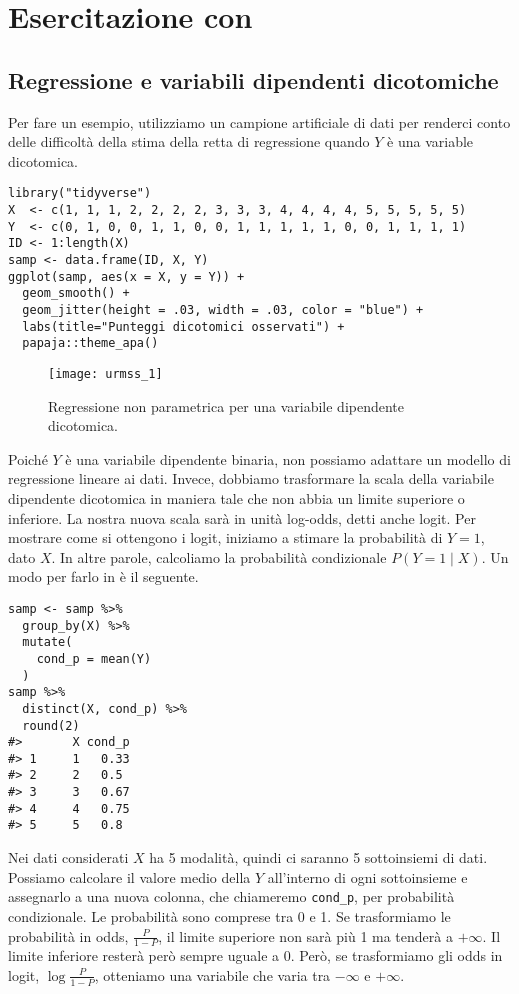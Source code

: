 \chapter{Esercitazione con \R}
\label{chapter:esercitazione_irt} 

\section{Regressione e variabili dipendenti dicotomiche}

Per fare un esempio, utilizziamo un campione artificiale di dati per renderci conto delle difficoltà della stima della retta di regressione quando $Y$ è una variable dicotomica.

\begin{lstlisting}
library("tidyverse")
X  <- c(1, 1, 1, 2, 2, 2, 2, 3, 3, 3, 4, 4, 4, 4, 5, 5, 5, 5, 5)
Y  <- c(0, 1, 0, 0, 1, 1, 0, 0, 1, 1, 1, 1, 1, 0, 0, 1, 1, 1, 1)
ID <- 1:length(X)
samp <- data.frame(ID, X, Y)
ggplot(samp, aes(x = X, y = Y)) + 
  geom_smooth() +
  geom_jitter(height = .03, width = .03, color = "blue") + 
  labs(title="Punteggi dicotomici osservati") +
  papaja::theme_apa()
\end{lstlisting} 

\begin{figure}[h!]
  \begin{center}
    \texttt{[image: urmss\_1]}
    \caption{Regressione non parametrica per una variabile dipendente dicotomica.}
    \label{fig:nonpar_dic}
  \end{center}
\end{figure}
 
Poiché $Y$ è una variabile dipendente binaria, non possiamo adattare un modello di regressione lineare ai dati. 
Invece, dobbiamo trasformare la scala della variabile dipendente dicotomica in maniera tale che non abbia un limite superiore o inferiore. 
La nostra nuova scala sarà in unità log-odds, detti anche logit. 
Per mostrare come si ottengono i logit, iniziamo a stimare la probabilità di $Y = 1$, dato $X$. 
In altre parole, calcoliamo la probabilità condizionale $P(Y = 1 \mid X)$.
Un modo per farlo in \R\; è il seguente.

\begin{lstlisting}
samp <- samp %>% 
  group_by(X) %>% 
  mutate(
    cond_p = mean(Y)
  ) 
samp %>% 
  distinct(X, cond_p) %>% 
  round(2) 
#>       X cond_p
#> 1     1   0.33
#> 2     2   0.5 
#> 3     3   0.67
#> 4     4   0.75
#> 5     5   0.8 
\end{lstlisting} 
Nei dati considerati $X$ ha 5 modalità, quindi ci saranno 5 sottoinsiemi di dati.
Possiamo calcolare il valore medio della $Y$ all'interno di ogni sottoinsieme e assegnarlo a una nuova colonna, che chiameremo \texttt{cond\_p}, per probabilità condizionale.
Le probabilità sono comprese tra 0 e 1.  
Se trasformiamo le probabilità in odds, $\frac{P}{1-P}$, il limite superiore non sarà più 1 ma tenderà a $+\infty$.
Il limite inferiore resterà però sempre uguale a 0.
Però, se trasformiamo gli odds in logit, $\log\frac{P}{1-P}$, otteniamo una variabile che varia tra $-\infty$ e $+\infty$.

